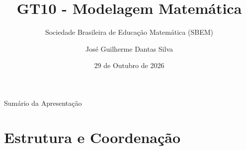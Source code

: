 \documentclass[10pt, aspectratio=169]{beamer}
\title[GT10 - SBEM]{GT10 - Modelagem Matemática}
\subtitle{Sociedade Brasileira de Educação Matemática (SBEM)}
\author[José G. D. Silva]{José Guilherme Dantas Silva}
\institute[UESC]{Universidade Estadual de Santa Cruz (UESC)}
\date{29 de Outubro de 2026}
\begin{document}
\begin{frame}
    \transdissolve[duration=0.4]
    \titlepage
\end{frame}

\begin{frame}{Sumário da Apresentação}
    \transboxin[duration=0.4]
    \tableofcontents[pausesections]
\end{frame}

\section{Estrutura e Coordenação}
\end{document}
